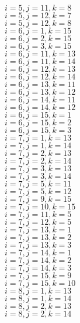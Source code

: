 \documentclass[14pt]{article}
\begin{document}
    $i=5,j=11,k=8 $ \\ 
    $i=5,j=12,k=7 $ \\ 
    $i=5,j=12,k=8 $ \\ 
    $i=6,j=1,k=15 $ \\ 
    $i=6,j=2,k=15 $ \\ 
    $i=6,j=3,k=15 $ \\ 
    $i=6,j=11,k=13 $ \\ 
    $i=6,j=11,k=14 $ \\ 
    $i=6,j=12,k=13 $ \\ 
    $i=6,j=12,k=14 $ \\ 
    $i=6,j=13,k=11 $ \\ 
    $i=6,j=13,k=12 $ \\ 
    $i=6,j=14,k=11 $ \\ 
    $i=6,j=14,k=12 $ \\ 
    $i=6,j=15,k=1 $ \\ 
    $i=6,j=15,k=2 $ \\ 
    $i=6,j=15,k=3 $ \\ 
    $i=7,j=1,k=13 $ \\ 
    $i=7,j=1,k=14 $ \\ 
    $i=7,j=2,k=13 $ \\ 
    $i=7,j=2,k=14 $ \\ 
    $i=7,j=3,k=13 $ \\ 
    $i=7,j=3,k=14 $ \\ 
    $i=7,j=5,k=11 $ \\ 
    $i=7,j=5,k=12 $ \\ 
    $i=7,j=9,k=15 $ \\ 
    $i=7,j=10,k=15 $ \\ 
    $i=7,j=11,k=5 $ \\ 
    $i=7,j=12,k=5 $ \\ 
    $i=7,j=13,k=1 $ \\ 
    $i=7,j=13,k=2 $ \\ 
    $i=7,j=13,k=3 $ \\ 
    $i=7,j=14,k=1 $ \\ 
    $i=7,j=14,k=2 $ \\ 
    $i=7,j=14,k=3 $ \\ 
    $i=7,j=15,k=9 $ \\ 
    $i=7,j=15,k=10 $ \\ 
    $i=8,j=1,k=13 $ \\ 
    $i=8,j=1,k=14 $ \\ 
    $i=8,j=2,k=13 $ \\ 
    $i=8,j=2,k=14 $ \\ 
\end{document}

